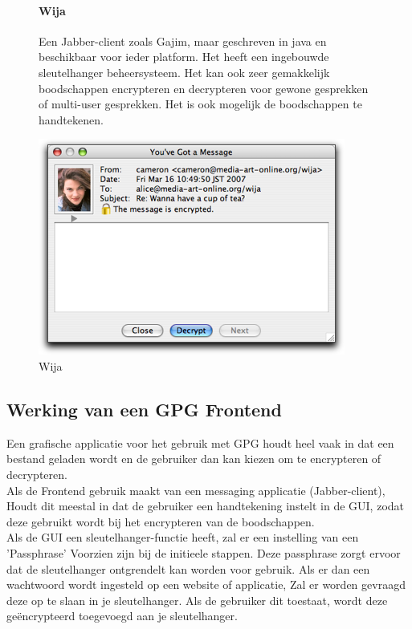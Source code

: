 \documentclass[12pt]{article}
\begin{document}
				\begin{figure}[!ht]				
					\paragraph{Wija}
						Een Jabber-client zoals Gajim, maar geschreven in java en beschikbaar voor ieder platform.
						Het heeft een ingebouwde sleutelhanger beheersysteem. Het kan ook zeer gemakkelijk boodschappen encrypteren en decrypteren voor gewone gesprekken of 													multi-user gesprekken.
						Het is ook mogelijk de boodschappen te handtekenen.
					\begin{center}
						\includegraphics[scale=0.7]{Pictures/wija}
					\end{center}
					\caption{Wija}
				\end{figure}
				
		\subsection{Werking van een GPG Frontend}\label{Frontend}
			Een grafische applicatie voor het gebruik met GPG houdt heel vaak in dat een bestand
			geladen wordt en de gebruiker dan kan kiezen om te encrypteren of decrypteren.\\
			Als de Frontend gebruik maakt van een messaging applicatie (Jabber-client),
			Houdt dit meestal in dat de gebruiker een handtekening instelt in de GUI,
			zodat deze gebruikt wordt bij het encrypteren van de boodschappen.\\
			Als de GUI een sleutelhanger-functie heeft, zal er een instelling van een 'Passphrase'
			Voorzien zijn bij de initieele stappen. Deze passphrase zorgt ervoor dat de sleutelhanger
			ontgrendelt kan worden voor gebruik. Als er dan een wachtwoord wordt ingesteld op een
			website of applicatie, Zal er worden gevraagd deze op te slaan in je sleutelhanger.
			Als de gebruiker dit toestaat, wordt deze geëncrypteerd toegevoegd aan je sleutelhanger.
			
\end{document}
